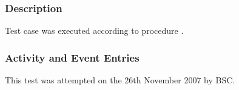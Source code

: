 




\subsubsection{Description}
Test case  was executed according to procedure .

\subsubsection{Activity and Event Entries}
This test was attempted on the 26th November 2007 by BSC.


